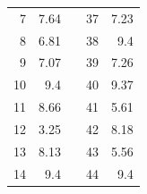 \begin{table}[H]
\begin{tabular}{|r|r|l|r|r|}
  7                                                         & 7.64                                                      &  & 37                                                                              & 7.23                                                                             \\ \cline{1-2} \cline{4-5} 
  8                                                         & 6.81                                                      &  & 38                                                                              & 9.4                                                                              \\ \cline{1-2} \cline{4-5} 
  9                                                         & 7.07                                                      &  & 39                                                                              & 7.26                                                                             \\ \cline{1-2} \cline{4-5} 
  10                                                        & 9.4                                                       &  & 40                                                                              & 9.37                                                                             \\ \cline{1-2} \cline{4-5} 
  11                                                        & 8.66                                                      &  & 41                                                                              & 5.61                                                                             \\ \cline{1-2} \cline{4-5} 
  12                                                        & 3.25                                                      &  & 42                                                                              & 8.18                                                                             \\ \cline{1-2} \cline{4-5} 
  13                                                        & 8.13                                                      &  & 43                                                                              & 5.56                                                                             \\ \cline{1-2} \cline{4-5} 
  14                                                        & 9.4                                                       &  & 44                                                                              & 9.4                                                                              \\ \cline{1-2} \cline{4-5} 

\end{tabular}
\end{table}
